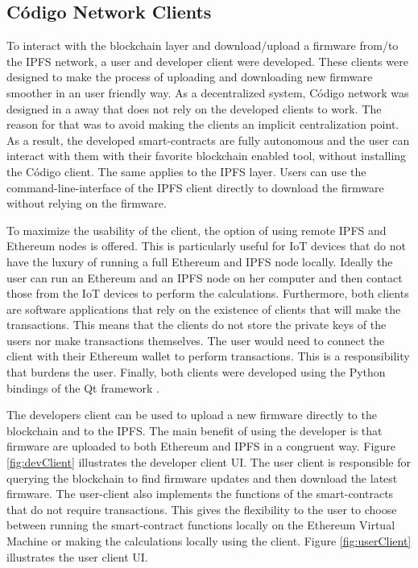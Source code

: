 {{\subsection{Código Network Clients}{
To interact with the blockchain layer and download/upload a firmware from/to the IPFS network, a user and developer client were developed. These clients were designed to make the process of uploading and downloading new firmware smoother in an user friendly way. As a decentralized system, Código network was designed in a away that does not rely on the developed clients to work. The reason for that was to avoid making the clients an implicit centralization point. As a result, the developed smart-contracts are fully autonomous and the user can interact with them with their favorite blockchain enabled tool, without installing the Código client. The same applies to the IPFS layer. Users can use the command-line-interface of the IPFS client directly to download the firmware without relying on the firmware.

To maximize the usability of the client, the option of using remote IPFS and Ethereum nodes is offered. This is particularly useful for IoT devices that do not have the luxury of running a full Ethereum and IPFS node locally. Ideally the user can run an Ethereum and an IPFS node on her computer and then contact those from the IoT devices to perform the calculations. Furthermore, both clients are software applications that rely on the existence of clients that will make the transactions. This means that the clients do not store the private keys of the users nor make transactions themselves. The user would need to connect the client with their Ethereum wallet to perform transactions. This is a responsibility that burdens the user. Finally, both clients were developed using the Python bindings of the Qt framework \cite{summerfield2007rapid}.

The developers client can be used to upload a new firmware directly to the blockchain and to the IPFS. The main benefit of using the developer is that firmware are uploaded to both  Ethereum and IPFS in a congruent way. Figure \ref{fig:devClient} illustrates the developer client UI. The user client is responsible for querying the blockchain to find firmware updates and then download the latest firmware. The user-client also implements the functions of the smart-contracts that do not require transactions. This gives the flexibility to the user to choose between running the smart-contract functions locally on the Ethereum Virtual Machine or making the calculations locally using the client. Figure \ref{fig:userClient} illustrates the user client UI.

}}}
